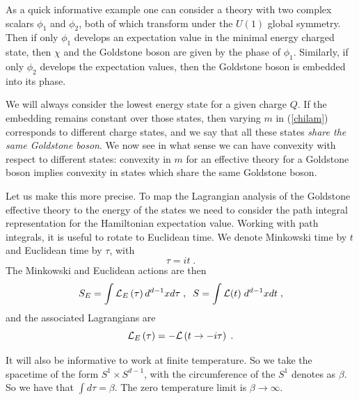 \documentclass[11pt]{article}
\numberwithin{equation}{section}
\newcommand{\be}{\begin{equation}} \newcommand{\ee}{\end{equation}}
\begin{document}
As a quick informative example one can consider a theory with two complex scalars $\phi_1$ and $\phi_2$, both of which transform under the $U(1)$ global symmetry. Then if only $\phi_1$ develops an expectation value in the minimal energy charged state, then $\chi$ and the Goldstone boson are given by the phase of $\phi_1$. Similarly, if only $\phi_2$ develops the expectation values, then the Goldstone boson is embedded into its phase. 

We will always consider the lowest energy state for a given charge $Q$. If the embedding remains constant over those states, then varying $m$ in (\ref{chilam}) corresponds to different charge states, and we say that all these states {\it share the same Goldstone boson}. We now see in what sense we can have convexity with respect to different states: convexity in $m$ for an effective theory for a Goldstone boson implies convexity in states which share the same Goldstone boson. 

Let us make this more precise. To map the Lagrangian analysis of the Goldstone effective theory to the energy of the states we need to consider the path integral representation for the Hamiltonian expectation value. Working with path integrals, it is useful to rotate to Euclidean time. We denote Minkowski time by $t$ and Euclidean time by $\tau$, with 
   \be
   \tau = it \;.
   \ee
The Minkowski and Euclidean actions are then
\be
S_E = \int {\cal L}_E\left(\tau\right) d^{d-1}x d\tau \;,\;\; S = \int {\cal L}(t)\; d^{d-1}x dt \;,
\ee
and the associated Lagrangians are
\be
{\cal L}_E\left(\tau\right) = - {\cal L}\left(t \rightarrow -i\tau\right) \;.
\label{eutomink}
\ee

It will also be informative to work at finite temperature. So we take the spacetime of the form $S^1 \times S^{d-1}$, with the circumference of the $S^1$ denotes as $\beta$. So we have that $\int d\tau = \beta$. The zero temperature limit is $\beta \rightarrow \infty$. 
\end{document}
